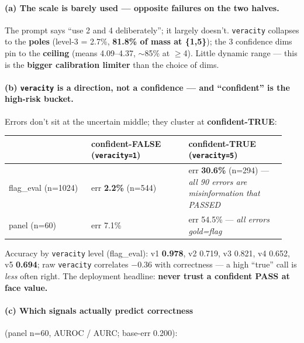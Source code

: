 \documentclass[11pt]{article}
\begin{document}
\paragraph{(a) The scale is barely used --- opposite failures on the two halves.}
The prompt says ``use 2 and 4 deliberately''; it largely doesn't. \texttt{veracity} collapses
to the \textbf{poles} (level-3 = 2.7\%, \textbf{81.8\% of mass at \{1,5\}}); the 3 confidence
dims pin to the \textbf{ceiling} (means 4.09--4.37, $\sim$85\% at $\geq$4). Little dynamic
range --- this is the \textbf{bigger calibration limiter} than the choice of dims.

\paragraph{(b) \texttt{veracity} is a direction, not a confidence --- and ``confident'' is
the high-risk bucket.} Errors don't sit at the uncertain middle; they cluster at
\textbf{confident-TRUE}:

\begin{longtable}{@{}>{\raggedright\arraybackslash}p{0.28\linewidth}
  >{\raggedright\arraybackslash}p{0.33\linewidth}
  >{\raggedright\arraybackslash}p{0.33\linewidth}@{}}
\toprule
 & \textbf{confident-FALSE (\texttt{veracity=1})} & \textbf{confident-TRUE
(\texttt{veracity=5})} \\
\midrule
flag\_eval (n=1024) & err \textbf{2.2\%} (n=544) & err \textbf{30.6\%} (n=294) --- \emph{all
90 errors are misinformation that PASSED} \\
panel (n=60) & err 7.1\% & err 54.5\% --- \emph{all errors gold=flag} \\
\bottomrule
\end{longtable}

Accuracy by \texttt{veracity} level (flag\_eval): v1 \textbf{0.978}, v2 0.719, v3 0.821, v4
0.652, v5 \textbf{0.694}; raw \texttt{veracity} correlates \textbf{$-0.36$} with correctness
--- a high ``true'' call is \emph{less} often right. The deployment headline: \textbf{never
trust a confident PASS at face value.}

\paragraph{(c) Which signals actually predict correctness} (panel n=60, AUROC / AURC;
base-err 0.200):
\end{document}

